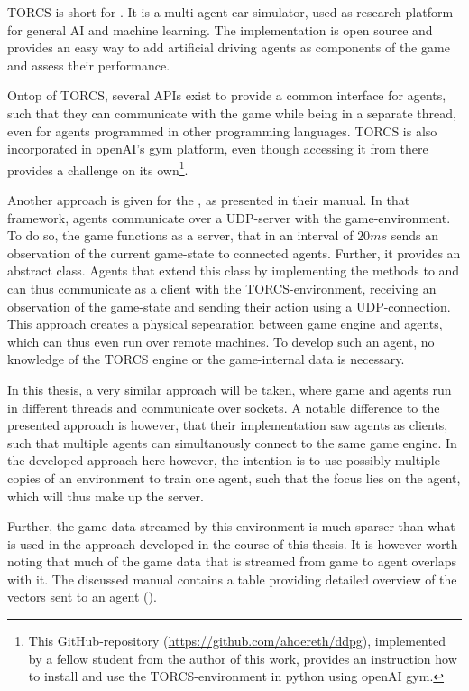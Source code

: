 TORCS is short for \cite{wymann_torcs_2013, wymann_torcs_2015}. It is a multi-agent car simulator, used as research platform for general AI and machine learning. The implementation is open source and provides an easy way to add artificial driving agents as components of the game and assess their performance. 

Ontop of TORCS, several APIs exist to provide a common interface for agents, such that they can communicate with the game while being in a separate thread, even for agents programmed in other programming languages. TORCS is also incorporated in openAI's gym platform, even though accessing it from there provides a challenge on its own\footnote{This GitHub-repository (\url{https://github.com/ahoereth/ddpg}), implemented by a fellow student from the author of this work, provides an instruction how to install and use the TORCS-environment in python using openAI gym.}. 

Another approach is given for the , as presented in their manual\cite{loiacono_simulated_2013}. In that framework, agents communicate over a UDP-server with the game-environment. To do so, the game functions as a server, that in an interval of $20ms$ sends an observation of the current game-state to connected agents. Further, it provides an abstract  class. Agents that extend this class by implementing the methods to  and  can thus communicate as a client with the TORCS-environment, receiving an observation of the game-state and sending their action using a UDP-connection. This approach creates a physical sepearation between game engine and agents, which can thus even run over remote machines. To develop such an agent, no knowledge of the TORCS engine or the game-internal data is necessary. 

In this thesis, a very similar approach will be taken, where game and agents run in different threads and communicate over sockets. A notable difference to the presented approach is however, that their implementation saw agents as clients, such that multiple agents can simultanously connect to the same game engine. In the developed approach here however, the intention is to use possibly multiple copies of an environment to train one agent, such that the focus lies on the agent, which will thus make up the server. 

Further, the game data streamed by this environment is much sparser than what is used in the approach developed in the course of this thesis. It is however worth noting that much of the game data that is streamed from game to agent overlaps with it. The discussed manual \cite{loiacono_simulated_2013} contains a table providing detailed overview of the vectors sent to an agent ().

